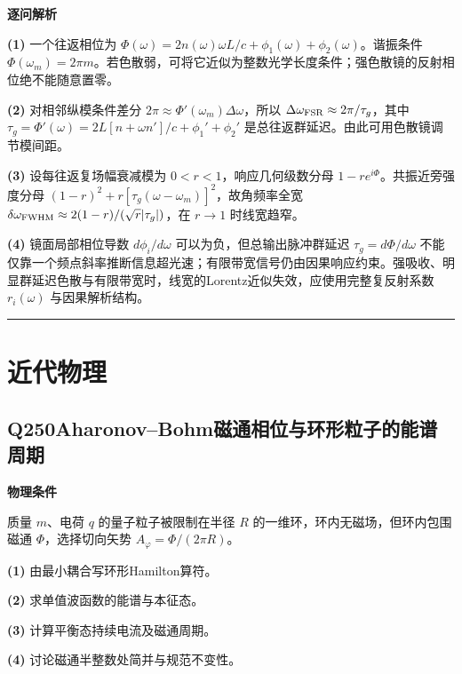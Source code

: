 \documentclass[UTF8,a4paper,11pt,oneside,openany]{ctexbook}
\begin{document}
\par\medskip\noindent\textbf{逐问解析}
\par\noindent\textbf{(1)} 一个往返相位为 \(\Phi(\omega)=2n(\omega)\omega L/c+\phi_1(\omega)+\phi_2(\omega)\)。谐振条件 \(\Phi(\omega_m)=2\pi m\)。若色散弱，可将它近似为整数光学长度条件；强色散镜的反射相位绝不能随意置零。
\par\noindent\textbf{(2)} 对相邻纵模条件差分 \(2\pi\approx\Phi'(\omega_m)\Delta\omega\)，所以 \(\Delta\omega_{\rm FSR}\approx2\pi/\tau_g\)，其中 \(\tau_g=\Phi'(\omega)=2L[n+\omega n']/c+\phi_1'+\phi_2'\) 是总往返群延迟。由此可用色散镜调节模间距。
\par\noindent\textbf{(3)} 设每往返复场幅衰减模为 \(0<r<1\)，响应几何级数分母 \(1-re^{i\Phi}\)。共振近旁强度分母 \((1-r)^2+r[\tau_g(\omega-\omega_m)]^2\)，故角频率全宽 \(\delta\omega_{\rm FWHM}\approx2(1-r)/(\sqrt r|\tau_g|)\)，在 \(r\to1\) 时线宽趋窄。
\par\noindent\textbf{(4)} 镜面局部相位导数 \(d\phi_i/d\omega\) 可以为负，但总输出脉冲群延迟 \(\tau_g=d\Phi/d\omega\) 不能仅靠一个频点斜率推断信息超光速；有限带宽信号仍由因果响应约束。强吸收、明显群延迟色散与有限带宽时，线宽的Lorentz近似失效，应使用完整复反射系数 \(r_i(\omega)\) 与因果解析结构。

\par\bigskip\hrule\bigskip
\chapter{近代物理}
\section*{Q250\quad Aharonov–Bohm磁通相位与环形粒子的能谱周期}
\textbf{物理条件}\par 质量 \(m\)、电荷 \(q\) 的量子粒子被限制在半径 \(R\) 的一维环，环内无磁场，但环内包围磁通 \(\Phi\)，选择切向矢势 \(A_\varphi=\Phi/(2\pi R)\)。
\par\noindent\textbf{(1)} 由最小耦合写环形Hamilton算符。
\par\noindent\textbf{(2)} 求单值波函数的能谱与本征态。
\par\noindent\textbf{(3)} 计算平衡态持续电流及磁通周期。
\par\noindent\textbf{(4)} 讨论磁通半整数处简并与规范不变性。
\end{document}
